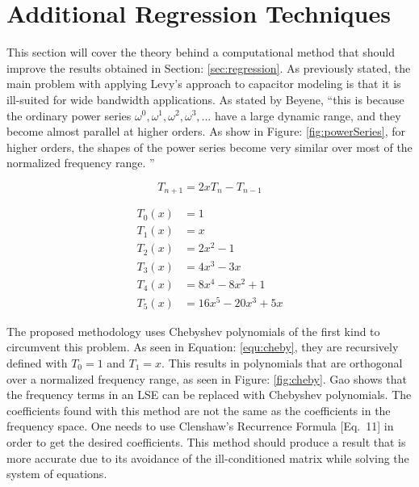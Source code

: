 \section{Additional Regression Techniques}
\label{app:adtl_regression}
\nocite{neu_ModelSynth}
\nocite{cuth_regression}
\nocite{bbc_chebyshev}



This section will cover the theory behind a computational method that should improve the results obtained in Section: \ref{sec:regression}. As previously stated, the main problem with applying Levy's approach to capacitor modeling is that it is ill-suited for wide bandwidth applications. As stated by Beyene, ``this is because the ordinary power series ${\omega ^0, \omega ^1, \omega ^2, \omega ^3,...}$ have a large dynamic range, and they become almost parallel at higher orders. As show in Figure: \ref{fig:powerSeries}, for higher orders, the shapes of the power series become very similar over most of the normalized frequency range. \cite{beyene_uwave}''

\begin{equation}
\label{equ:cheby}
T_{n+1} = 2xT_{n}-T_{n-1}
\end{equation}

\begin{equation}
    \label{equ:chebyPolys}
    \begin{split}
         T_0(x) &= 1           \\
         T_1(x) &= x           \\
         T_2(x) &= 2x^2-1      \\
         T_3(x) &= 4x^3-3x     \\
         T_4(x) &= 8x^4-8x^2+1 \\
         T_5(x) &= 16x^5-20x^3+5x
    \end{split}
\end{equation}

The proposed methodology uses Chebyshev polynomials of the first kind to circumvent this problem. As seen in Equation: \eqref{equ:cheby}, they are recursively defined with $T_0 = 1$ and $T_1 = x$. This results in polynomials that are orthogonal over a normalized frequency range, as seen in Figure: \ref{fig:cheby}. Gao\cite{gao_blackBox} shows that the frequency terms in an LSE can be replaced with Chebyshev polynomials. The coefficients found with this method are not the same as the coefficients in the frequency space. One needs to use Clenshaw's Recurrence Formula \cite{gao_blackBox}[Eq.~11] in order to get the desired coefficients. This method should produce a result that is more accurate due to its avoidance of the ill-conditioned matrix while solving the system of equations.




